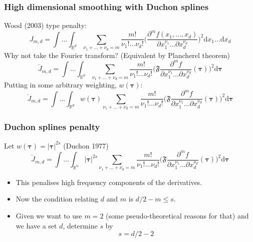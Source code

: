 \documentclass[ignorenonframetext]{beamer} %
\newcommand{\bi}{\begin{itemize}}
\newcommand{\ei}{\end{itemize}}
\begin{document}
\begin{frame}
	\frametitle{High dimensional smoothing with Duchon splines}
	Wood (2003) type penalty:
	\begin{equation*}
		J_{m,d} = \int \ldots \int_{\mathbb{R}^d} \sum_{\nu_1 + \dots + \nu_d=m} \frac{m!}{\nu_1! \dots \nu_d!}\Big( \frac{\partial^m f(x_1,\dots,x_d)}{\partial x_1^{\nu_1} \ldots  \partial x_d^{\nu_d}} \Big)^2 \text{d} x_1 \ldots  \text{d} x_d
	\end{equation*}
	Why not take the Fourier transform? (Equivalent by Plancherel theorem)
	\begin{equation*}
		\breve{J}_{m,d} = \int \ldots \int_{\mathbb{R}^d} \sum_{\nu_1 + \dots + \nu_d=m} \frac{m!}{\nu_1! \dots \nu_d!}\Big( \mathfrak{F} \frac{\partial^m f}{\partial x_1^{\nu_1} \ldots  \partial x_d^{\nu_d}}(\boldsymbol{\tau}) \Big)^2 \text{d} \boldsymbol{\tau}
	\end{equation*}
	Putting in some arbitrary weighting, $w(\boldsymbol{\tau})$:
	\begin{equation*}
		\breve{J}_{m,d} = \int \ldots \int_{\mathbb{R}^d} w(\boldsymbol{\tau}) \sum_{\nu_1 + \dots + \nu_d=m} \frac{m!}{\nu_1! \dots \nu_d!}\Big( \mathfrak{F} \frac{\partial^m f}{\partial x_1^{\nu_1} \ldots  \partial x_d^{\nu_d}}(\boldsymbol{\tau}) \Big)^2 \text{d} \boldsymbol{\tau}
	\end{equation*}
\end{frame}

\begin{frame}
	\frametitle{Duchon splines penalty}
	Let $w(\boldsymbol{\tau})=\lvert \boldsymbol{\tau} \rvert^{2s}$ (Duchon 1977)
	\begin{equation*}
		\breve{J}_{m,d} = \int \ldots \int_{\mathbb{R}^n} \lvert \boldsymbol{\tau} \rvert^{2s} \sum_{\nu_1 + \dots + \nu_d=m} \frac{m!}{\nu_1! \dots \nu_d!}\Big( \mathfrak{F} \frac{\partial^m f}{\partial x_1^{\nu_1} \ldots  \partial x_d^{\nu_d}}(\boldsymbol{\tau}) \Big)^2 \text{d} \boldsymbol{\tau}
	\end{equation*}	
	
	\bi
	\item This penalises high frequency components of the derivatives.
	\item Now the condition relating $d$ and $m$ is $d/2 -m \leq s$.
	\item Given we want to use $m=2$ (some pseudo-theoretical reasons for that) and we have a set $d$, determine $s$ by
	\begin{equation}
		s=d/2-2
	\end{equation}
	\ei
	
\end{frame}
\end{document}
